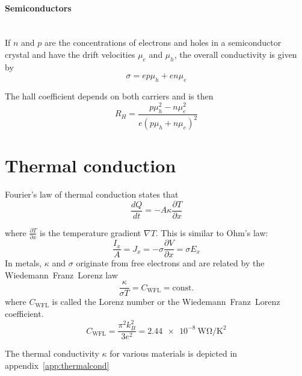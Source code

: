 \paragraph{Semiconductors}~\\
If $n$ and $p$ are the concentrations of electrons and holes in a
semiconductor crystal and have the drift velocities $\mu_e$ and $\mu_h$,
the overall conductivity is given by
\begin{equation}
    \sigma = e p \mu_h + e n \mu_e
\end{equation}

The hall coefficient depends on both carriers and is then
\begin{equation}
    R_H = \frac{p \mu_h^2 - n \mu_e^2}{e\left(p \mu_h + n \mu_e \right)^2}
\end{equation}


\section{Thermal conduction}

Fourier's law of thermal conduction states that
\begin{equation}
	\frac{dQ}{dt} = -A \kappa \frac{\partial T}{\partial x}
\end{equation}

where $\frac{\partial T}{\partial x}$ is the temperature gradient $\nabla T$.
This is similar to Ohm's law:
\begin{equation*}
	\frac{I_x}{A} = J_x = - \sigma \frac{\partial V}{\partial x} = \sigma E_x
\end{equation*}
In metals, $\kappa$ and $\sigma$ originate from free electrons and are related by the Wiedemann~Franz~Lorenz law
\begin{equation}
	\frac{\kappa}{\sigma T} = C_{\mathrm{WFL}} = \text{const.}
\end{equation}
where $C_{\mathrm{WFL}}$ is called the Lorenz number or the Wiedemann~Franz~Lorenz coefficient.
\begin{equation}
	C_{\mathrm{WFL}} = \frac{\pi^2 k_B^2}{3 e^2} = \SI{2.44e-8}{\watt\ohm\per\kelvin\squared}
\end{equation}

The thermal conductivity $\kappa$ for various materials is depicted in appendix~\ref{app:thermalcond}
